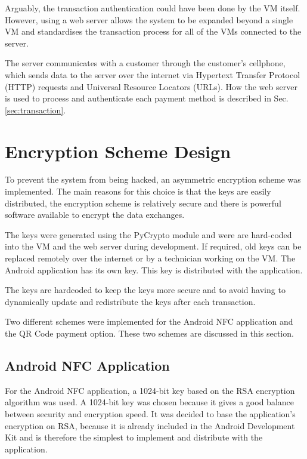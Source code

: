 Arguably, the transaction authentication could have been done by the VM itself. However,
using a web server allows the system to be expanded beyond a single VM and
standardises the transaction process for all of the VMs connected to the server.

The server communicates with a customer through the customer's cellphone,
which sends data to the server over the internet via Hypertext Transfer Protocol
(HTTP) requests and Universal Resource Locators (URLs). How the web server is used to
process and authenticate each payment method is described in Sec. \ref{sec:transaction}.
 
\section{Encryption Scheme Design}

To prevent the system from being hacked, an asymmetric encryption scheme was
implemented. The main reasons for this choice is that the keys are easily
distributed, the encryption scheme is relatively secure and there is powerful
software available to encrypt the data exchanges.

The keys were generated using the PyCrypto module and were are hard-coded
into the VM and the web server during development. If required, old
keys can be replaced remotely over the internet or by a technician working on the
VM. The Android application has its own key. This key is distributed with the
application. 

The keys are hardcoded to keep the keys more secure and to avoid having to dynamically
update and redistribute the keys after each transaction.

Two different schemes were implemented for the Android NFC application and the
QR Code payment option. These two schemes are discussed in this section.

\subsection{Android NFC Application}

For the Android NFC application, a 1024-bit key based on the RSA encryption algorithm was
used. A 1024-bit key was chosen because it gives a good balance between security and
encryption speed. It was decided to base the application's encryption on RSA, because it
is already included in the Android Development Kit and is therefore the simplest to
implement and distribute with the application.

